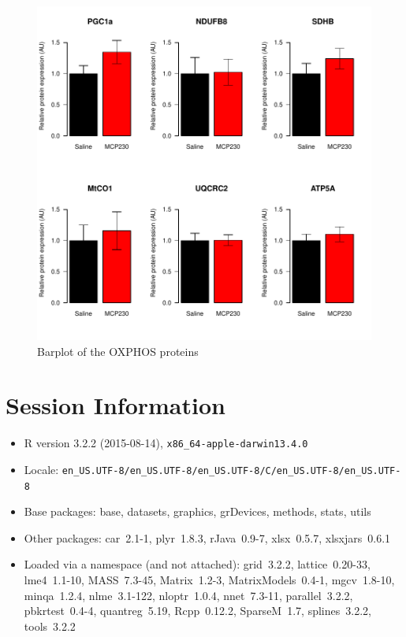 \documentclass{article}
\begin{document}
\begin{figure}
\begin{center}
\includegraphics{2016-01-21_MitochondrialProteins-barplot-combined}
\end{center}
\caption{Barplot of the OXPHOS proteins}
\label{fig:barplot-combined}
\end{figure}

\section*{Session Information}
\begin{itemize}\raggedright
  \item R version 3.2.2 (2015-08-14), \verb|x86_64-apple-darwin13.4.0|
  \item Locale: \verb|en_US.UTF-8/en_US.UTF-8/en_US.UTF-8/C/en_US.UTF-8/en_US.UTF-8|
  \item Base packages: base, datasets, graphics, grDevices, methods,
    stats, utils
  \item Other packages: car~2.1-1, plyr~1.8.3, rJava~0.9-7, xlsx~0.5.7,
    xlsxjars~0.6.1
  \item Loaded via a namespace (and not attached): grid~3.2.2,
    lattice~0.20-33, lme4~1.1-10, MASS~7.3-45, Matrix~1.2-3,
    MatrixModels~0.4-1, mgcv~1.8-10, minqa~1.2.4, nlme~3.1-122,
    nloptr~1.0.4, nnet~7.3-11, parallel~3.2.2, pbkrtest~0.4-4,
    quantreg~5.19, Rcpp~0.12.2, SparseM~1.7, splines~3.2.2, tools~3.2.2
\end{itemize}
\end{document}
